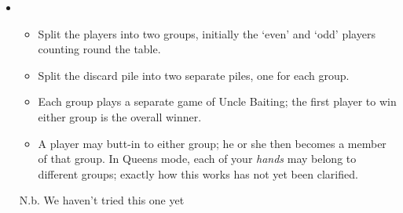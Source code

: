 \documentclass[12pt]{article}
\begin{document}
\begin{itemize}
  \item
    \begin{itemize}
      \item Split the players into two groups, initially the `even' and `odd' players counting round the table.
      \item Split the discard pile into two separate piles, one for each group.
      \item Each group plays a separate game of Uncle Baiting;  the first player to
        win either group is the overall winner.
      \item A player may butt-in to either group;  he or she then becomes a member of
        that group.  In Queens mode, each of your \textit{hands} may belong to different groups;
        exactly how this works has not yet been clarified.
    \end{itemize}

    N.b. We haven't tried this one yet    

\end{itemize}
\end{document}
